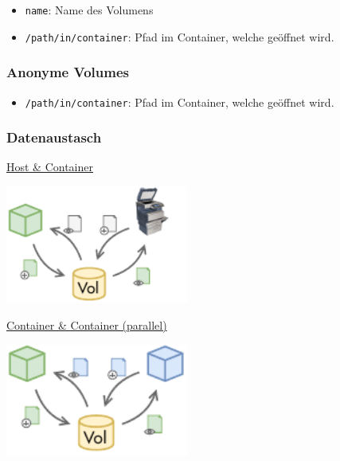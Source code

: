 \documentclass[
  10pt,
  a4paper,
]{article}
\newenvironment{Shaded}{}{}
\newcommand{\AttributeTok}[1]{\textcolor[rgb]{0.84,0.23,0.29}{#1}}
\newcommand{\ExtensionTok}[1]{\textcolor[rgb]{0.84,0.23,0.29}{\textbf{#1}}}
\newcommand{\NormalTok}[1]{\textcolor[rgb]{0.14,0.16,0.18}{#1}}
\newcommand{\OperatorTok}[1]{\textcolor[rgb]{0.14,0.16,0.18}{#1}}
\providecommand{\tightlist}{%
  \setlength{\itemsep}{0pt}\setlength{\parskip}{0pt}}\usepackage{longtable,booktabs,array}
\newcommand*\circled[1]{\tikz[baseline=(char.base)]{
          \node[shape=circle,draw,inner sep=1pt] (char) {{\scriptsize#1}};}}
\begin{document}
\begin{multicols*}{2}
\begin{itemize}
\tightlist
\item
  \texttt{name}: Name des Volumens
\item
  \texttt{/path/in/container}: Pfad im Container, welche geöffnet wird.
\end{itemize}

\subsubsection{Anonyme Volumes}\label{anonyme-volumes}

\begin{Shaded}
\end{Shaded}

\begin{itemize}
\tightlist
\item
  \texttt{/path/in/container}: Pfad im Container, welche geöffnet wird.
\end{itemize}

\subsubsection{Datenaustasch}\label{datenaustasch}

\circled{1} \ul{Host \& Container}

\begin{center}
\includegraphics[width=6cm,height=\textheight]{images/docker/volume_exchange_host.pdf}
\end{center}

\circled{2} \ul{Container \& Container (parallel)}

\begin{center}
\includegraphics[width=6cm,height=\textheight]{images/docker/volume_exchange_parallel.pdf}
\end{center}


\end{multicols*}
\end{document}
